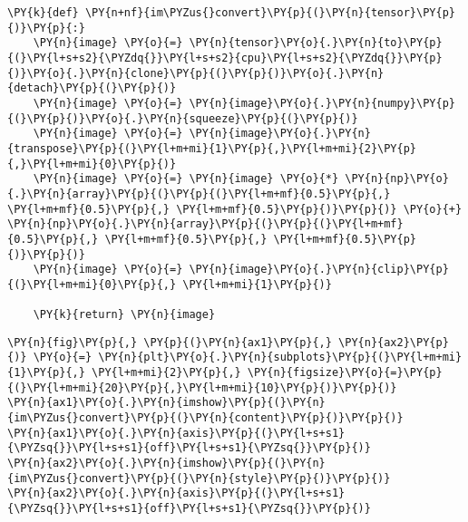     \begin{tcolorbox}[breakable, size=fbox, boxrule=1pt, pad at break*=1mm,colback=cellbackground, colframe=cellborder]
\begin{Verbatim}[commandchars=\\\{\}]
\PY{k}{def} \PY{n+nf}{im\PYZus{}convert}\PY{p}{(}\PY{n}{tensor}\PY{p}{)}\PY{p}{:}
    \PY{n}{image} \PY{o}{=} \PY{n}{tensor}\PY{o}{.}\PY{n}{to}\PY{p}{(}\PY{l+s+s2}{\PYZdq{}}\PY{l+s+s2}{cpu}\PY{l+s+s2}{\PYZdq{}}\PY{p}{)}\PY{o}{.}\PY{n}{clone}\PY{p}{(}\PY{p}{)}\PY{o}{.}\PY{n}{detach}\PY{p}{(}\PY{p}{)}
    \PY{n}{image} \PY{o}{=} \PY{n}{image}\PY{o}{.}\PY{n}{numpy}\PY{p}{(}\PY{p}{)}\PY{o}{.}\PY{n}{squeeze}\PY{p}{(}\PY{p}{)}
    \PY{n}{image} \PY{o}{=} \PY{n}{image}\PY{o}{.}\PY{n}{transpose}\PY{p}{(}\PY{l+m+mi}{1}\PY{p}{,}\PY{l+m+mi}{2}\PY{p}{,}\PY{l+m+mi}{0}\PY{p}{)}
    \PY{n}{image} \PY{o}{=} \PY{n}{image} \PY{o}{*} \PY{n}{np}\PY{o}{.}\PY{n}{array}\PY{p}{(}\PY{p}{(}\PY{l+m+mf}{0.5}\PY{p}{,} \PY{l+m+mf}{0.5}\PY{p}{,} \PY{l+m+mf}{0.5}\PY{p}{)}\PY{p}{)} \PY{o}{+} \PY{n}{np}\PY{o}{.}\PY{n}{array}\PY{p}{(}\PY{p}{(}\PY{l+m+mf}{0.5}\PY{p}{,} \PY{l+m+mf}{0.5}\PY{p}{,} \PY{l+m+mf}{0.5}\PY{p}{)}\PY{p}{)}
    \PY{n}{image} \PY{o}{=} \PY{n}{image}\PY{o}{.}\PY{n}{clip}\PY{p}{(}\PY{l+m+mi}{0}\PY{p}{,} \PY{l+m+mi}{1}\PY{p}{)}

    \PY{k}{return} \PY{n}{image}
\end{Verbatim}
\end{tcolorbox}

    \begin{tcolorbox}[breakable, size=fbox, boxrule=1pt, pad at break*=1mm,colback=cellbackground, colframe=cellborder]
\begin{Verbatim}[commandchars=\\\{\}]
\PY{n}{fig}\PY{p}{,} \PY{p}{(}\PY{n}{ax1}\PY{p}{,} \PY{n}{ax2}\PY{p}{)} \PY{o}{=} \PY{n}{plt}\PY{o}{.}\PY{n}{subplots}\PY{p}{(}\PY{l+m+mi}{1}\PY{p}{,} \PY{l+m+mi}{2}\PY{p}{,} \PY{n}{figsize}\PY{o}{=}\PY{p}{(}\PY{l+m+mi}{20}\PY{p}{,}\PY{l+m+mi}{10}\PY{p}{)}\PY{p}{)}
\PY{n}{ax1}\PY{o}{.}\PY{n}{imshow}\PY{p}{(}\PY{n}{im\PYZus{}convert}\PY{p}{(}\PY{n}{content}\PY{p}{)}\PY{p}{)}
\PY{n}{ax1}\PY{o}{.}\PY{n}{axis}\PY{p}{(}\PY{l+s+s1}{\PYZsq{}}\PY{l+s+s1}{off}\PY{l+s+s1}{\PYZsq{}}\PY{p}{)}
\PY{n}{ax2}\PY{o}{.}\PY{n}{imshow}\PY{p}{(}\PY{n}{im\PYZus{}convert}\PY{p}{(}\PY{n}{style}\PY{p}{)}\PY{p}{)}
\PY{n}{ax2}\PY{o}{.}\PY{n}{axis}\PY{p}{(}\PY{l+s+s1}{\PYZsq{}}\PY{l+s+s1}{off}\PY{l+s+s1}{\PYZsq{}}\PY{p}{)}
\end{Verbatim}
\end{tcolorbox}

